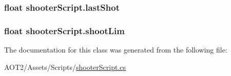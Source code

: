 \subsubsection[{last\+Shot}]{\setlength{\rightskip}{0pt plus 5cm}float shooter\+Script.\+last\+Shot\hspace{0.3cm}{\ttfamily [private]}}\label{classshooter_script_a3b49886ffefc2a63ad5cb5995da709b4}
\hypertarget{classshooter_script_a35395b1d291048e31353f9300c4e61be}{}
\subsubsection[{shoot\+Lim}]{\setlength{\rightskip}{0pt plus 5cm}float shooter\+Script.\+shoot\+Lim}\label{classshooter_script_a35395b1d291048e31353f9300c4e61be}


The documentation for this class was generated from the following file\+:\begin{DoxyCompactItemize}
\item 
A\+O\+T2/\+Assets/\+Scripts/\hyperlink{shooter_script_8cs}{shooter\+Script.\+cs}\end{DoxyCompactItemize}
